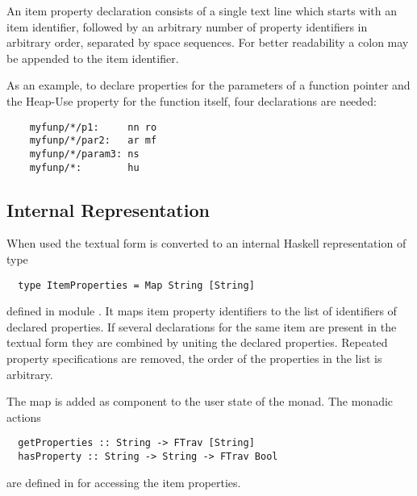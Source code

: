 An item property declaration consists of a single text line which starts with an item identifier, followed
by an arbitrary number of property identifiers in arbitrary order, separated by space sequences.
For better readability a colon may be appended to the item identifier.

As an example, to declare properties for the parameters  of a function pointer 
and the Heap-Use property for the function itself, four declarations are needed:
\begin{verbatim}
    myfunp/*/p1:     nn ro
    myfunp/*/par2:   ar mf
    myfunp/*/param3: ns
    myfunp/*:        hu
\end{verbatim}

\subsection{Internal Representation}
\label{impl-itemprops-internal}

When used the textual form is converted to an internal Haskell representation of type 
\begin{verbatim}
  type ItemProperties = Map String [String]
\end{verbatim}
defined in module . It maps item property identifiers to the list of identifiers of declared properties.
If several declarations for the same item are present in the textual form they are combined by uniting the 
declared properties. Repeated property specifications are removed, the order of the properties in the list is
arbitrary.

The  map is added as component to the user state of the  monad. The monadic actions
\begin{verbatim}
  getProperties :: String -> FTrav [String]
  hasProperty :: String -> String -> FTrav Bool
\end{verbatim}
are defined in  for accessing the item properties.
